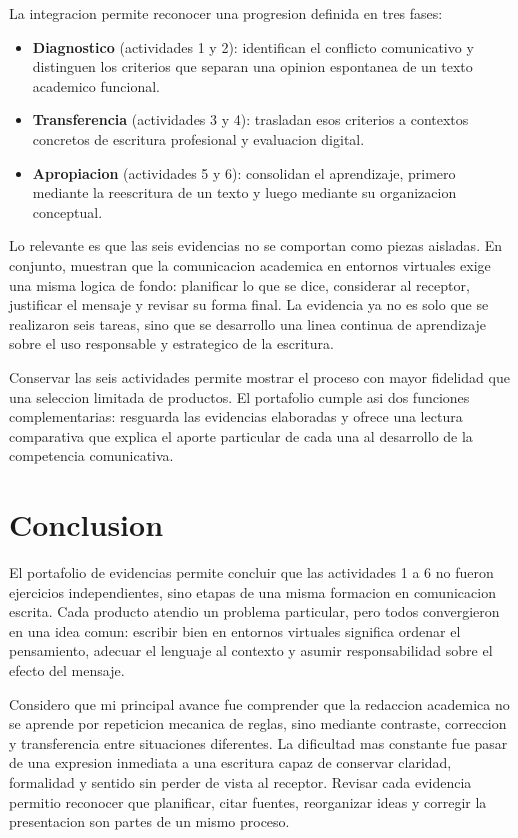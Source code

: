 \documentclass[
	spanish,
	letterpaper, oneside
]{article}
\begin{document}
La integracion permite reconocer una progresion definida en tres fases:

\begin{itemize}
  \item \textbf{Diagnostico} (actividades 1 y 2): identifican el conflicto comunicativo y distinguen los criterios que separan una opinion espontanea de un texto academico funcional.
  \item \textbf{Transferencia} (actividades 3 y 4): trasladan esos criterios a contextos concretos de escritura profesional y evaluacion digital.
  \item \textbf{Apropiacion} (actividades 5 y 6): consolidan el aprendizaje, primero mediante la reescritura de un texto y luego mediante su organizacion conceptual.
\end{itemize}

Lo relevante es que las seis evidencias no se comportan como piezas aisladas. En conjunto, muestran que la comunicacion academica en entornos virtuales exige una misma logica de fondo: planificar lo que se dice, considerar al receptor, justificar el mensaje y revisar su forma final. La evidencia ya no es solo que se realizaron seis tareas, sino que se desarrollo una linea continua de aprendizaje sobre el uso responsable y estrategico de la escritura.

Conservar las seis actividades permite mostrar el proceso con mayor fidelidad que una seleccion limitada de productos. El portafolio cumple asi dos funciones complementarias: resguarda las evidencias elaboradas y ofrece una lectura comparativa que explica el aporte particular de cada una al desarrollo de la competencia comunicativa.

\section{Conclusion}

El portafolio de evidencias permite concluir que las actividades 1 a 6 no fueron ejercicios independientes, sino etapas de una misma formacion en comunicacion escrita. Cada producto atendio un problema particular, pero todos convergieron en una idea comun: escribir bien en entornos virtuales significa ordenar el pensamiento, adecuar el lenguaje al contexto y asumir responsabilidad sobre el efecto del mensaje.

Considero que mi principal avance fue comprender que la redaccion academica no se aprende por repeticion mecanica de reglas, sino mediante contraste, correccion y transferencia entre situaciones diferentes. La dificultad mas constante fue pasar de una expresion inmediata a una escritura capaz de conservar claridad, formalidad y sentido sin perder de vista al receptor. Revisar cada evidencia permitio reconocer que planificar, citar fuentes, reorganizar ideas y corregir la presentacion son partes de un mismo proceso.
\end{document}
